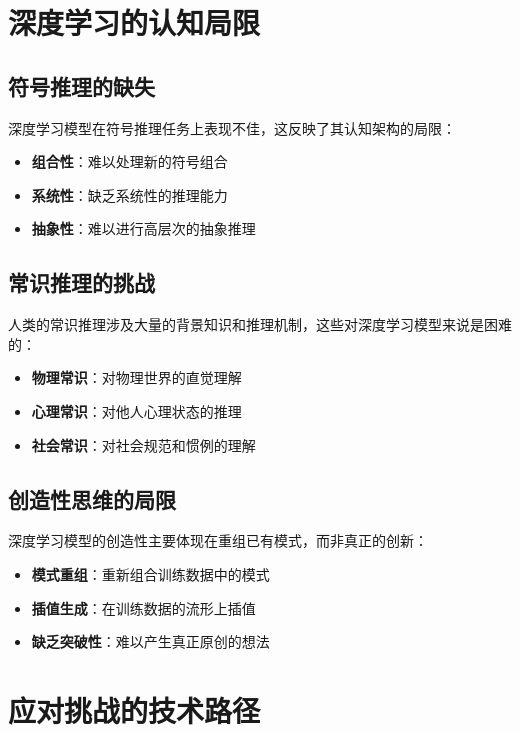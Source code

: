 \section{深度学习的认知局限}

\subsection{符号推理的缺失}

深度学习模型在符号推理任务上表现不佳，这反映了其认知架构的局限：

\begin{itemize}
\item \textbf{组合性}：难以处理新的符号组合
\item \textbf{系统性}：缺乏系统性的推理能力
\item \textbf{抽象性}：难以进行高层次的抽象推理
\end{itemize}

\subsection{常识推理的挑战}

人类的常识推理涉及大量的背景知识和推理机制，这些对深度学习模型来说是困难的：

\begin{itemize}
\item \textbf{物理常识}：对物理世界的直觉理解
\item \textbf{心理常识}：对他人心理状态的推理
\item \textbf{社会常识}：对社会规范和惯例的理解
\end{itemize}

\subsection{创造性思维的局限}

深度学习模型的创造性主要体现在重组已有模式，而非真正的创新：

\begin{itemize}
\item \textbf{模式重组}：重新组合训练数据中的模式
\item \textbf{插值生成}：在训练数据的流形上插值
\item \textbf{缺乏突破性}：难以产生真正原创的想法
\end{itemize}

\section{应对挑战的技术路径}

